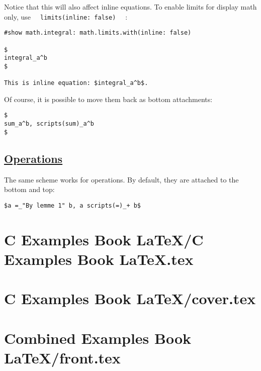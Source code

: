 Notice that this will also affect inline equations. To enable limits for
display math only, use
\texttt{\ }{\texttt{\ limits(inline:\ false)\ }}\texttt{\ } :

\begin{verbatim}
#show math.integral: math.limits.with(inline: false)

$
integral_a^b
$

This is inline equation: $integral_a^b$.
\end{verbatim}

\pandocbounded{}

Of course, it is possible to move them back as bottom attachments:

\begin{verbatim}
$
sum_a^b, scripts(sum)_a^b
$
\end{verbatim}

\pandocbounded{}

\subsection{\texorpdfstring{\hyperref[operations]{Operations}}{Operations}}\label{operations}

The same scheme works for operations. By default, they are attached to
the bottom and top:

\begin{verbatim}
$a =_"By lemme 1" b, a scripts(=)_+ b$
\end{verbatim}

\pandocbounded{}








\section{C Examples Book LaTeX/C Examples Book LaTeX.tex}
\section{C Examples Book LaTeX/cover.tex}
\section{Combined Examples Book LaTeX/front.tex}
